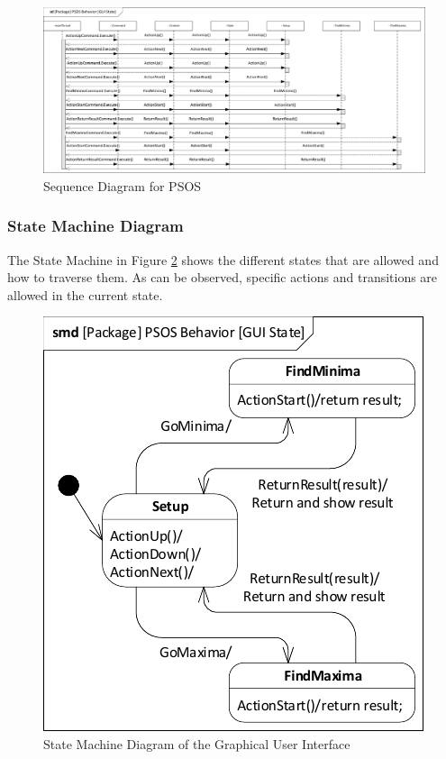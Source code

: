 \begin{figure}[H]
	\centering
	\includegraphics[width=1\linewidth]{diagram/sd_psos}
	\caption{Sequence Diagram for PSOS}
	\label{fig:sdpsos}
\end{figure}

\subsubsection{State Machine Diagram}\label{req:smd}

The State Machine in Figure \ref{fig:smdguistate} shows the different states that are allowed and how to traverse them. As can be observed, specific actions and transitions are allowed in the current state.

\begin{figure}[H]
	\centering
	\includegraphics[width=0.4\linewidth]{diagram/smd_gui_state}
	\caption{State Machine Diagram of the Graphical User Interface}
	\label{fig:smdguistate}
\end{figure}
